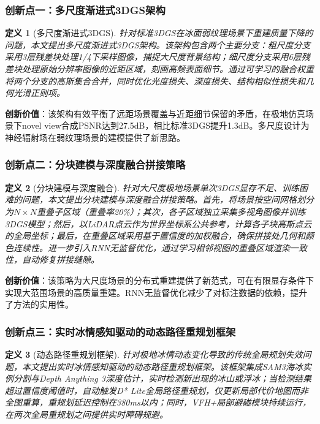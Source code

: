 \documentclass[12pt,a4paper]{ctexbook}
\newtheorem{definition}{定义}[chapter]
\begin{document}
\subsubsection{创新点一：多尺度渐进式3DGS架构}

\begin{definition}[多尺度渐进式3DGS]
针对标准3DGS在冰面弱纹理场景下重建质量下降的问题，本文提出多尺度渐进式3DGS架构。该架构包含两个主要分支：粗尺度分支采用3层残差块处理1/4下采样图像，捕捉大尺度背景结构；细尺度分支采用6层残差块处理原始分辨率图像的近距区域，刻画高频表面细节。通过可学习的融合权重将两个分支的高斯集合合并，同时优化光度损失、深度损失、结构相似性损失和几何光滑正则项。
\end{definition}

\textbf{创新价值}：该架构有效平衡了远距场景覆盖与近距细节保留的矛盾，在极地仿真场景下novel view合成PSNR达到27.5dB，相比标准3DGS提升1.3dB。多尺度设计为神经辐射场在弱纹理场景的建模提供了新思路。

\subsubsection{创新点二：分块建模与深度融合拼接策略}

\begin{definition}[分块建模与深度融合]
针对大尺度极地场景单次3DGS显存不足、训练困难的问题，本文提出分块建模与深度融合拼接策略。首先，将场景按空间网格划分为$N \times N$重叠子区域（重叠率20\%）；其次，各子区域独立采集多视角图像并训练3DGS模型；然后，以LiDAR点云作为世界坐标系公共参考，计算各子块高斯点云的全局坐标；最后，在重叠区域采用基于置信度的加权融合，确保拼接处几何和颜色连续性。进一步引入RNN无监督优化，通过学习相邻视图的重叠区域渲染一致性，自动修复拼接缝隙。
\end{definition}

\textbf{创新价值}：该策略为大尺度场景的分布式重建提供了新范式，可在有限显存条件下实现大范围场景的高质量重建。RNN无监督优化减少了对标注数据的依赖，提升了方法的实用性。

\subsubsection{创新点三：实时冰情感知驱动的动态路径重规划框架}

\begin{definition}[动态路径重规划框架]
针对极地冰情动态变化导致的传统全局规划失效问题，本文提出实时冰情感知驱动的动态路径重规划框架。该框架集成SAM3海冰实例分割与Depth Anything 3深度估计，实时检测新出现的冰山或浮冰；当检测结果超过置信度阈值时，自动触发D* Lite全局路径重规划，仅更新局部代价地图而非全图重算，重规划延迟控制在380ms以内；同时，VFH+局部避碰模块持续运行，在两次全局重规划之间提供实时障碍规避。
\end{definition}
\end{document}
